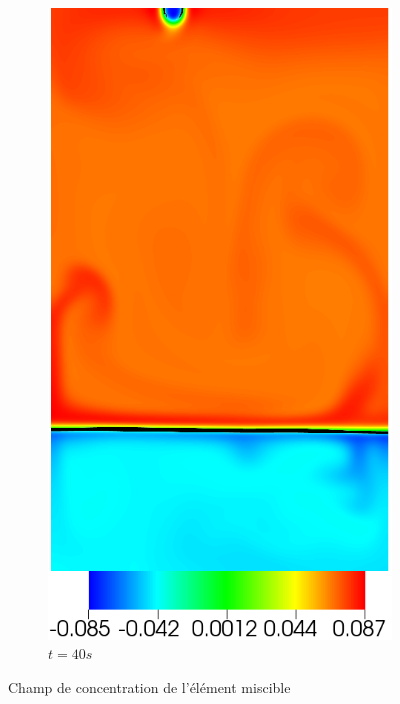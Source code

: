 \begin{figure}[H]
\begin{subfigure}[ht!]{0.2\textwidth}
		\includegraphics[width=1\textwidth]{figure/PT_RT/concent0/visit0013.png}
		\caption{$t=40s$}
	\end{subfigure}
	\caption{Champ de concentration de l'élément miscible}
	\label{fig:rt2}
\end{figure}


